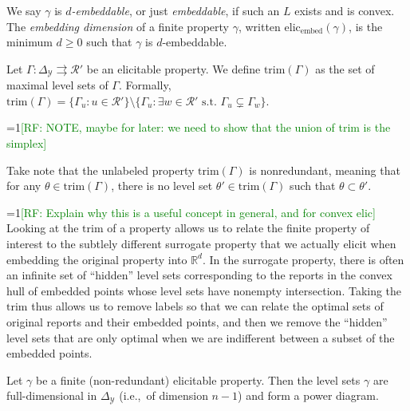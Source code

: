 \documentclass[anon,12pt]{colt2019}
\newcommand{\Comments}{1}
\newcommand{\mynote}[2]{\ifnum\Comments=1\textcolor{#1}{#2}\fi}
\newcommand{\raf}[1]{\mynote{green}{[RF: #1]}}
\newcommand{\reals}{\mathbb{R}}
\newcommand{\elicembed}{\mathrm{elic}_\mathrm{embed}}
\newcommand{\simplex}{\Delta_\Y}
\newcommand{\R}{\mathcal{R}}
\newcommand{\Y}{\mathcal{Y}}
\newcommand{\toto}{\rightrightarrows}
\newcommand{\trim}{\mathrm{trim}}
\begin{document}
\begin{definition}
  We say $\gamma$ is \emph{$d$-embeddable}, or just \emph{embeddable}, if such an $L$ exists and is convex.
  The \emph{embedding dimension} of a finite property $\gamma$, written $\elicembed(\gamma)$, is the minimum $d\geq 0$ such that $\gamma$ is $d$-embeddable.
\end{definition}

\begin{definition}\label{def:trim}
  Let $\Gamma:\simplex \toto\R'$ be an elicitable property.
  We define $\trim(\Gamma)$ as the set of maximal level sets of $\Gamma$.
  Formally, $\trim(\Gamma) = \{\Gamma_u : u \in \R'\} \setminus \{ \Gamma_u : \exists w \in \R' \text{ s.t. } \Gamma_u \subsetneq \Gamma_w \}$.
\end{definition}
\raf{NOTE, maybe for later: we need to show that the union of trim is the simplex}

Take note that the unlabeled property $\trim(\Gamma)$ is nonredundant, meaning that for any $\theta \in \trim(\Gamma)$, there is no level set $\theta' \in \trim(\Gamma)$ such that $\theta \subset \theta'$.

\raf{Explain why this is a useful concept in general, and for convex elic}
Looking at the $\trim$ of a property allows us to relate the finite property of interest to the subtlely different surrogate property that we actually elicit when embedding the original property into $\reals^d$.
In the surrogate property, there is often an infinite set of ``hidden'' level sets corresponding to the reports in the convex hull of embedded points whose level sets have nonempty intersection.
Taking the $\trim$ thus allows us to remove labels so that we can relate the optimal sets of original reports and their embedded points, and then we remove the ``hidden'' level sets that are only optimal when we are indifferent between a subset of the embedded points.

\begin{lemma}\label{lem:finite-full-dim}
  Let $\gamma$ be a finite (non-redundant) elicitable property.
  Then the level sets $\gamma$ are full-dimensional in $\simplex$ (i.e.,\ of dimension $n-1$) and form a power diagram.
\end{lemma}
\end{document}
